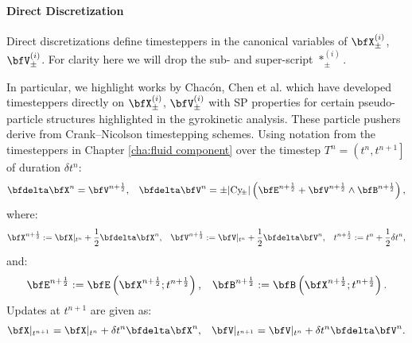 \paragraph*{Direct Discretization}
    Direct discretizations define timesteppers in the canonical variables of $\bfX_{\pm}^{(i)}$, $\bfV_{\pm}^{(i)}$. For clarity here we will drop the sub- and super-script $*_{\pm}^{(i)}$.

    \shortline

    In particular, we highlight works by Chacón, Chen et al. \cite{Chen_Chacón_Barnes_2011, Chacón_Chen_Barnes_2013, Chen_Chacón_2014, Chen_Chacón_2015} which
     have developed timesteppers directly on $\bfX_{\pm}^{(i)}$, $\bfV_{\pm}^{(i)}$ with SP properties for certain pseudo-particle structures highlighted in the gyrokinetic analysis. These particle pushers derive from Crank--Nicolson timestepping schemes. Using notation from the timesteppers in Chapter \ref{cha:fluid component} over the timestep $T^{n} = \left(t^{n}, t^{n + 1}\right]$ of duration $\delta t^{n}$:
    \begin{align}
        \bfdelta\bfX^{n}
            =  \bfV^{n + \frac{1}{2}},  &&
        \bfdelta\bfV^{n}
            =  \pm |\rmCy\!_{\pm}|\left(\bfE^{n + \frac{1}{2}} + \bfV^{n + \frac{1}{2}}\wedge\bfB^{n + \frac{1}{2}}\right),
    \end{align}
    where:
    \begin{align}
        \bfX^{n + \frac{1}{2}}  :=  \bfX|_{t^{n}} + \frac{1}{2}\bfdelta\bfX^{n},  &&
        \bfV^{n + \frac{1}{2}}  :=  \bfV|_{t^{n}} + \frac{1}{2}\bfdelta\bfV^{n},  &&
        t^{n + \frac{1}{2}}  :=  t^{n} + \frac{1}{2}\delta t^{n},
    \end{align}
    and:
    \begin{align}
        \bfE^{n + \frac{1}{2}}  :=  \bfE\left(\bfX^{n + \frac{1}{2}}; t^{n + \frac{1}{2}}\right),  &&
        \bfB^{n + \frac{1}{2}}  :=  \bfB\left(\bfX^{n + \frac{1}{2}}; t^{n + \frac{1}{2}}\right).
    \end{align}
    Updates at $t^{n + 1}$ are given as:
    \begin{align}
        \bfX|_{t^{n + 1}}  =  \bfX|_{t^{n}} + \delta t^{n}\bfdelta\bfX^{n},  &&
        \bfV|_{t^{n + 1}}  =  \bfV|_{t^{n}} + \delta t^{n}\bfdelta\bfV^{n}.
    \end{align}
    
    \shortline

